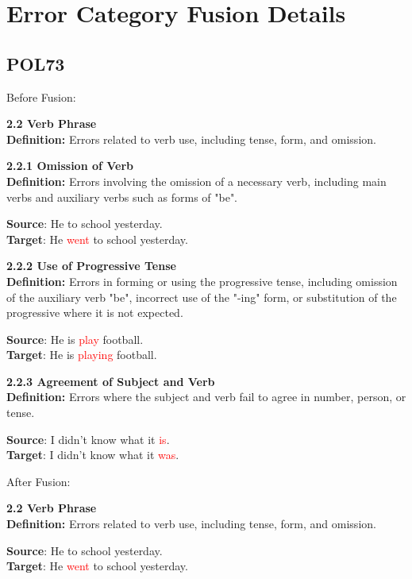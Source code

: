 \section{Error Category Fusion Details}
\label{appendix ablation}

\subsection{POL73}

Before Fusion:
\begin{tcolorbox}[breakable]
\noindent \textbf{2.2 Verb Phrase}\\
\textbf{Definition:} Errors related to verb use, including tense, form, and omission.

\noindent \textbf{2.2.1 Omission of Verb}\\
\textbf{Definition:} Errors involving the omission of a necessary verb, including main verbs and auxiliary verbs such as forms of "be".


\textbf{Source}: He to school yesterday. \\
\textbf{Target}: He \textcolor{red}{went} to school yesterday.


\noindent \textbf{2.2.2 Use of Progressive Tense}\\
\textbf{Definition:} Errors in forming or using the progressive tense, including omission of the auxiliary verb "be", incorrect use of the "-ing" form, or substitution of the progressive where it is not expected.


\textbf{Source}: He is \textcolor{red}{play} football. \\
\textbf{Target}: He is \textcolor{red}{playing} football.


\noindent \textbf{2.2.3 Agreement of Subject and Verb}\\
\textbf{Definition:} Errors where the subject and verb fail to agree in number, person, or tense.


\textbf{Source}: I didn't know what it \textcolor{red}{is}. \\
\textbf{Target}: I didn't know what it \textcolor{red}{was}.

\end{tcolorbox}
\noindent After Fusion:
\begin{tcolorbox}[breakable]
\noindent \textbf{2.2 Verb Phrase}\\
\textbf{Definition:} Errors related to verb use, including tense, form, and omission.


\textbf{Source}: He to school yesterday. \\
\textbf{Target}: He \textcolor{red}{went} to school yesterday.

\end{tcolorbox}


